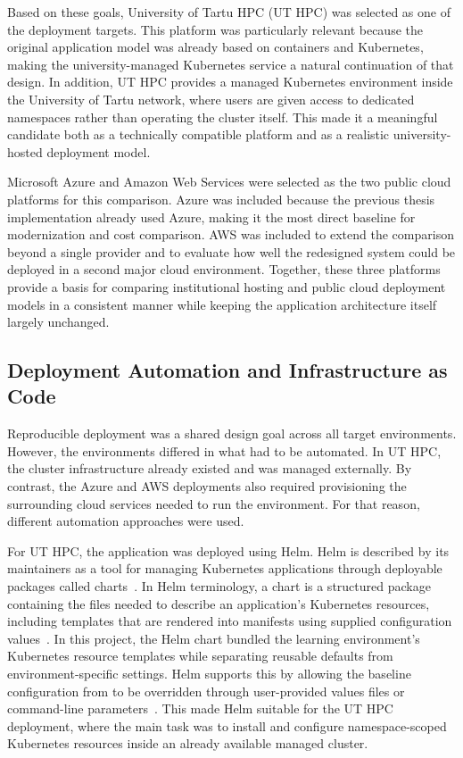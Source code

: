 Based on these goals, University of Tartu HPC (UT HPC) was selected as one of the deployment targets.
This platform was particularly relevant because the original application model was already based on containers and Kubernetes, making the university-managed Kubernetes service a natural continuation of that design.
In addition, UT HPC provides a managed Kubernetes environment inside the University of Tartu network, where users are given access to dedicated namespaces rather than operating the cluster itself.
This made it a meaningful candidate both as a technically compatible platform and as a realistic university-hosted deployment model.

Microsoft Azure and Amazon Web Services were selected as the two public cloud platforms for this comparison.
Azure was included because the previous thesis implementation already used Azure, making it the most direct baseline for modernization and cost comparison.
AWS was included to extend the comparison beyond a single provider and to evaluate how well the redesigned system could be deployed in a second major cloud environment.
Together, these three platforms provide a basis for comparing institutional hosting and public cloud deployment models in a consistent manner while keeping the application architecture itself largely unchanged.

\subsection{Deployment Automation and Infrastructure as Code} \label{subsec:deployment-automation-and-infrastructure-as-code}
Reproducible deployment was a shared design goal across all target environments.
However, the environments differed in what had to be automated.
In UT HPC, the cluster infrastructure already existed and was managed externally.
By contrast, the Azure and AWS deployments also required provisioning the surrounding cloud services needed to run the environment.
For that reason, different automation approaches were used.

For UT HPC, the application was deployed using Helm.
Helm is described by its maintainers as a tool for managing Kubernetes applications through deployable packages called charts~\cite{helm_using_helm}.
In Helm terminology, a chart is a structured package containing the files needed to describe an application's Kubernetes resources, including templates that are rendered into manifests using supplied configuration values~\cite{helm_charts}.
In this project, the Helm chart bundled the learning environment's Kubernetes resource templates while separating reusable defaults from environment-specific settings.
Helm supports this by allowing the baseline configuration from  to be overridden through user-provided values files or command-line parameters~\cite{helm_values_files}.
This made Helm suitable for the UT HPC deployment, where the main task was to install and configure namespace-scoped Kubernetes resources inside an already available managed cluster.


